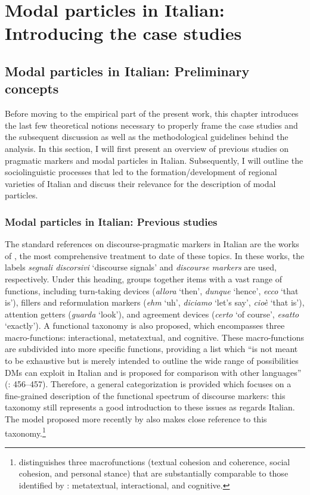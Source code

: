 \chapter{Modal particles in Italian: Introducing the case studies}\label{sec:5}
\hypertarget{Toc124860639}{}\section{Modal particles in Italian: Preliminary concepts}
\hypertarget{Toc124860640}{}
Before moving to the empirical part of the present work, this chapter introduces the last few theoretical notions necessary to properly frame the case studies and the subsequent discussion as well as the methodological guidelines behind the analysis. In this section, I will first present an overview of previous studies on pragmatic markers and modal particles in Italian. Subsequently, I will outline the sociolinguistic processes that led to the formation/development of regional varieties of Italian and discuss their relevance for the description of modal particles.

\largerpage[3]
\subsection{Modal particles in Italian: Previous studies}
\hypertarget{Toc124860641}{}
The standard references on discourse-pragmatic markers in Italian are the works of \citet{Bazzanella1995,Bazzanella2006}, the most comprehensive treatment to date of these topics. In these works, the labels \textit{segnali discorsivi} ‘discourse signals’ and \textit{discourse markers} are used, respectively. Under this heading, \citet[232--249]{Bazzanella1995} groups together items with a vast range of functions, including turn-taking devices (\textit{allora} ‘then’, \textit{dunque} ‘hence’, \textit{ecco} ‘that is’), fillers and reformulation markers (\textit{ehm} ‘uh’, \textit{diciamo} ‘let’s say’, \textit{cioè} ‘that is’), attention getters (\textit{guarda} ‘look’), and agreement devices (\textit{certo} ‘of course’, \textit{esatto} ‘exactly’). A functional taxonomy is also proposed, which encompasses three macro-functions: interactional, metatextual, and cognitive. These macro-functions are subdivided into more specific functions, providing a list which “is not meant to be exhaustive but is merely intended to outline the wide range of possibilities DMs can exploit in Italian and is proposed for comparison with other languages” (\citealt{Bazzanella2006}: 456–457). Therefore, a general categorization is provided which focuses on a fine-grained description of the functional spectrum of discourse markers: this taxonomy still represents a good introduction to these issues as regards Italian. The model proposed more recently by \citet{Ghezzi2014} also makes close reference to this taxonomy.\footnote{\citet{Ghezzi2014} distinguishes three macrofunctions (textual cohesion and coherence, social cohesion, and personal stance) that are substantially comparable to those identified by \citet{Bazzanella2006}: metatextual, interactional, and cognitive.}

